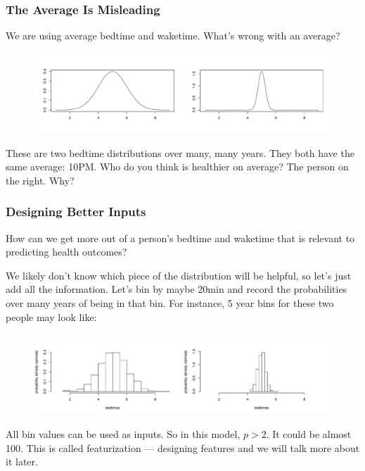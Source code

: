 \documentclass[handout]{beamer}
\begin{document}
\begin{frame}\frametitle{The Average Is Misleading}

We are using average bedtime and waketime. What's wrong with an average?

\begin{figure}
\centering
\includegraphics[width=4.5in]{two_dist}
\end{figure}

%
	
These are two bedtime distributions over many, many years. They both have the same average: 10PM. Who do you think is healthier on average? The person on the right. Why?
\end{frame}

\begin{frame}\frametitle{Designing Better Inputs}

\small
How can we get more  out of a person's bedtime and waketime that is relevant to predicting health outcomes?

We likely don't know which piece of the distribution will be helpful, so let's just add all the information. Let's bin by maybe 20min and record the probabilities over many years of being in that bin. For instance, 5 year bins for these two people may look like:

%	

\begin{figure}
\centering
\includegraphics[width=4.5in]{two_hists}
\end{figure}

All bin values can be used as inputs. So in this model, $p > 2$. It could be almost 100. This is called featurization --- designing features and we will talk more about it later.

\end{frame}
\end{document}
